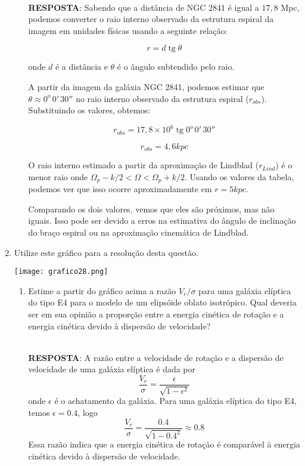 \documentclass[a4paper,12pt]{article}
\DeclareMathOperator{\tg}{tg}
\begin{document}
\begin{enumerate}
\begin{enumerate}
\noindent\hrulefill\\\textbf{RESPOSTA}: Sabendo que a distância de NGC 2841 é igual a $17,8$ Mpc, podemos converter o raio interno observado da estrutura espiral da imagem em unidades físicas usando a seguinte relação:

$$ r = d \tg \theta $$

onde $d$ é a distância e $\theta$ é o ângulo subtendido pelo raio.

A partir da imagem da galáxia NGC 2841, podemos estimar que $\theta \approx 0^o\,0'\,30''$ no raio interno observado da estrutura espiral ($r_{obs}$). Substituindo os valores, obtemos:

$$ r_{obs} =17,8 \times 10^6 \tg 0^o\,0'\,30'' $$

$$ r_{obs} = 4,6 kpc $$

O raio interno estimado a partir da aproximação de Lindblad ($r_{Lind}$) é o menor raio onde $\Omega_p - k/2 < \Omega < \Omega_p + k/2$. Usando os valores da tabela, podemos ver que isso ocorre aproximadamente em $r = 5 kpc$.

Comparando os dois valores, vemos que eles são próximos, mas não iguais. Isso pode ser devido a erros na estimativa do ângulo de inclinação do braço espiral ou na aproximação cinemática de Lindblad.

\noindent\hrulefill

\end{enumerate}

\item Utilize este gráfico para a resolução desta questão.

\begin{center}
\centering
\texttt{[image: grafico28.png]}
\end{center}


\begin{enumerate}

\item Estime a partir do gráfico acima a razão $V_r/\sigma$ para uma galáxia 
elíptica do tipo E4 para o modelo de um elipsóide oblato isotrópico. Qual 
deveria ser em sua opinião a proporção entre a energia cinética de rotação e 
a energia cinética devido à dispersão de velocidade?

\noindent\hrulefill\\\textbf{RESPOSTA}: A razão entre a velocidade de rotação e a dispersão de velocidade de uma galáxia elíptica é dada por
\[ \frac{V_r}{\sigma} = \frac{\epsilon}{\sqrt{1-\epsilon^2}} \]
onde $\epsilon$ é o achatamento da galáxia. Para uma galáxia elíptica do tipo E4, temos $\epsilon = 0.4$, logo
\[ \frac{V_r}{\sigma} = \frac{0.4}{\sqrt{1-0.4^2}} \approx 0.8 \]
Essa razão indica que a energia cinética de rotação é comparável à energia cinética devido à dispersão de velocidade.


\end{enumerate}
\end{enumerate}
\end{document}
